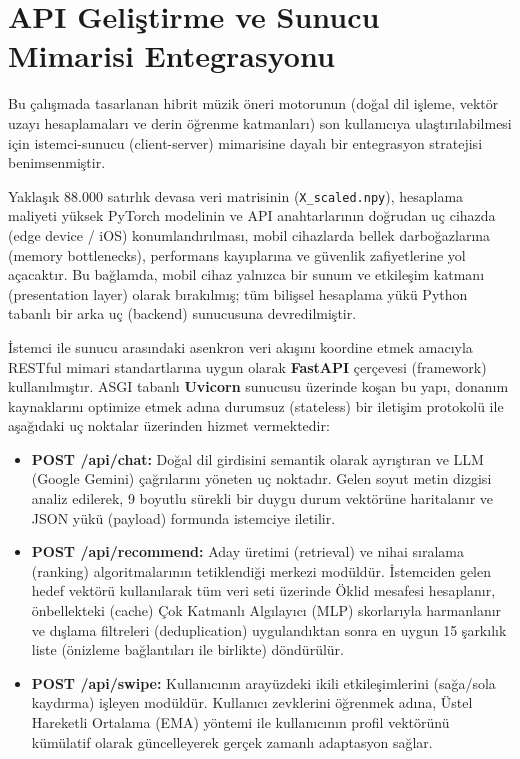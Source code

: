 \documentclass[12pt, a4paper]{report}
\begin{document}
\section{API Geliştirme ve Sunucu Mimarisi Entegrasyonu}

Bu çalışmada tasarlanan hibrit müzik öneri motorunun (doğal dil işleme, vektör uzayı hesaplamaları ve derin öğrenme katmanları) son kullanıcıya ulaştırılabilmesi için istemci-sunucu (client-server) mimarisine dayalı bir entegrasyon stratejisi benimsenmiştir.

Yaklaşık 88.000 satırlık devasa veri matrisinin (\texttt{X\_scaled.npy}), hesaplama maliyeti yüksek PyTorch modelinin ve API anahtarlarının doğrudan uç cihazda (edge device / iOS) konumlandırılması, mobil cihazlarda bellek darboğazlarına (memory bottlenecks), performans kayıplarına ve güvenlik zafiyetlerine yol açacaktır. Bu bağlamda, mobil cihaz yalnızca bir sunum ve etkileşim katmanı (presentation layer) olarak bırakılmış; tüm bilişsel hesaplama yükü Python tabanlı bir arka uç (backend) sunucusuna devredilmiştir.

İstemci ile sunucu arasındaki asenkron veri akışını koordine etmek amacıyla RESTful mimari standartlarına uygun olarak \textbf{FastAPI} çerçevesi (framework) kullanılmıştır. ASGI tabanlı \textbf{Uvicorn} sunucusu üzerinde koşan bu yapı, donanım kaynaklarını optimize etmek adına durumsuz (stateless) bir iletişim protokolü ile aşağıdaki uç noktalar üzerinden hizmet vermektedir:

\begin{itemize}
    \item \textbf{POST /api/chat:} Doğal dil girdisini semantik olarak ayrıştıran ve LLM (Google Gemini) çağrılarını yöneten uç noktadır. Gelen soyut metin dizgisi analiz edilerek, 9 boyutlu sürekli bir duygu durum vektörüne haritalanır ve JSON yükü (payload) formunda istemciye iletilir.
    \item \textbf{POST /api/recommend:} Aday üretimi (retrieval) ve nihai sıralama (ranking) algoritmalarının tetiklendiği merkezi modüldür. İstemciden gelen hedef vektörü kullanılarak tüm veri seti üzerinde Öklid mesafesi hesaplanır, önbellekteki (cache) Çok Katmanlı Algılayıcı (MLP) skorlarıyla harmanlanır ve dışlama filtreleri (deduplication) uygulandıktan sonra en uygun 15 şarkılık liste (önizleme bağlantıları ile birlikte) döndürülür.
    \item \textbf{POST /api/swipe:} Kullanıcının arayüzdeki ikili etkileşimlerini (sağa/sola kaydırma) işleyen modüldür. Kullanıcı zevklerini öğrenmek adına, Üstel Hareketli Ortalama (EMA) yöntemi ile kullanıcının profil vektörünü kümülatif olarak güncelleyerek gerçek zamanlı adaptasyon sağlar.
\end{itemize}
\end{document}
